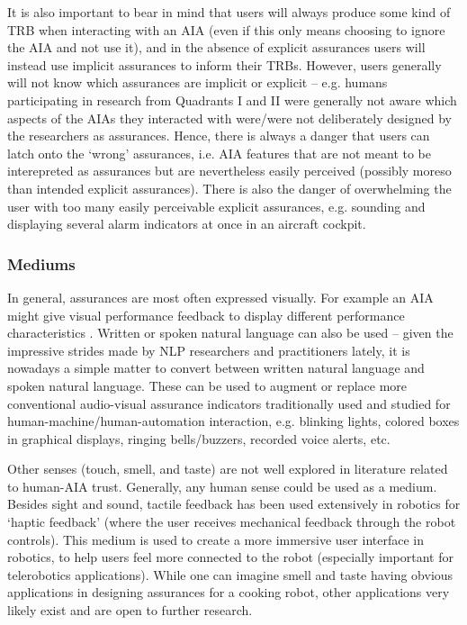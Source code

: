It is also important to bear in mind that users will always produce some kind of TRB when interacting with an AIA (even if this only means choosing to ignore the AIA and not use it), and in the absence of explicit assurances users will instead use implicit assurances to inform their TRBs. 
However, users generally will not know which assurances are implicit or explicit -- e.g. humans participating in research from Quadrants I and II were generally not aware which aspects of the AIAs they interacted with were/were not deliberately designed by the researchers as assurances. 
Hence, there is always a danger that users can latch onto the `wrong' assurances, i.e. AIA features that are not meant to be interepreted as assurances but are nevertheless easily perceived (possibly moreso than intended explicit assurances). There is also the danger of overwhelming the user with too many easily perceivable explicit assurances, e.g. sounding and displaying several alarm indicators at once in an aircraft cockpit. 

\subsubsection{Mediums}
In general, assurances are most often expressed visually. For example an AIA might give visual performance feedback to display different performance characteristics \cite{Chadalavada2015-wx,Muir1996-gt}. Written or spoken natural language can also be used \cite{Wang2016-id} -- given the impressive strides made by NLP researchers and practitioners lately, it is nowadays a simple matter to convert between written natural language and spoken natural language. 
These can be used to augment or replace more conventional audio-visual assurance indicators traditionally used and studied for human-machine/human-automation interaction, e.g. blinking lights, colored boxes in graphical displays, ringing bells/buzzers, recorded voice alerts, etc.
    
Other senses (touch, smell, and taste) are not well explored in literature related to human-AIA trust. Generally, any human sense could be used as a medium. Besides sight and sound, tactile feedback has been used extensively in robotics for `haptic feedback' (where the user receives mechanical feedback through the robot controls). This medium is used to create a more immersive user interface in robotics, to help users feel more connected to the robot (especially important for telerobotics applications). 
While one can imagine smell and taste having obvious applications in designing assurances for a cooking robot, other applications very likely exist and are open to further research.

